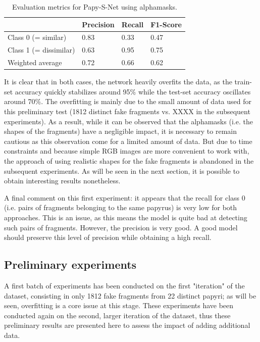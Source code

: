 \documentclass[11pt]{report}
\begin{document}
\begin{table}[h!]
\begin{tabular}{l|l|l|l|}
\cline{2-4}
                                             & Precision & Recall & F1-Score \\ \hline
\multicolumn{1}{|l|}{Class 0 (= similar)}    & 0.83      & 0.33   & 0.47     \\ \cline{1-1}
\multicolumn{1}{|l|}{Class 1 (= dissimilar)} & 0.63      & 0.95   & 0.75     \\ \hline
\multicolumn{1}{|l|}{Weighted average}       & 0.72      & 0.66   & 0.62     \\ \hline
\end{tabular}
\caption{Evaluation metrics for Papy-S-Net using alphamasks.}
\label{tab:tabpapyalpha}
\end{table}


It is clear that in both cases, the network heavily overfits the data, as the train-set accuracy quickly stabilizes around 95\% while the test-set accuracy oscillates around 70\%. The overfitting is mainly due to the small amount of data used for this preliminary test (1812 distinct fake fragments vs. XXXX in the subsequent experiments). As a result, while it can be observed that the alphamasks (i.e. the shapes of the fragments) have a negligible impact, it is necessary to remain cautious as this observation come for a limited amount of data.\newline
But due to time constraints and because simple RGB images are more convenient to work with, the approach of using realistic shapes for the fake fragments is abandoned in the subsequent experiments. As will be seen in the next section, it is possible to obtain interesting results nonetheless.\newline

A final comment on this first experiment: it appears that the recall for class 0 (i.e. pairs of fragments belonging to the same papyrus) is very low for both approaches. This is an issue, as this means the model is quite bad at detecting such pairs of fragments. However, the precision is very good. A good model should preserve this level of precision while obtaining a high recall.\newline

\subsection{Preliminary experiments}

A first batch of experiments has been conducted on the first "iteration" of the dataset, consisting in only 1812 fake fragments from 22 distinct papyri; as will be seen, overfitting is a core issue at this stage. These experiments have been conducted again on the second, larger iteration of the dataset, thus these preliminary results are presented here to assess the impact of adding additional data.\newline
\end{document}
